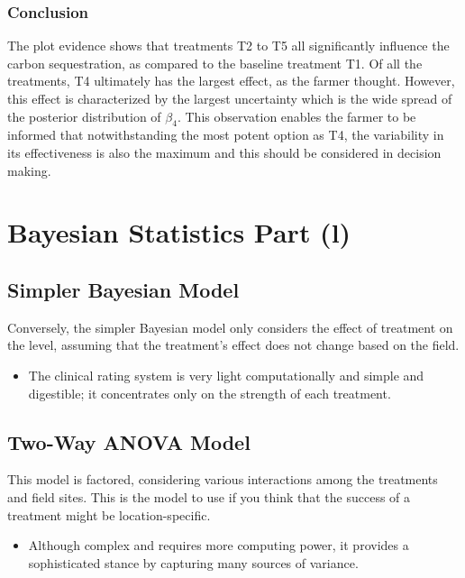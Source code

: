 \documentclass[
]{article}
\providecommand{\tightlist}{%
  \setlength{\itemsep}{0pt}\setlength{\parskip}{0pt}}
\begin{document}
\subsubsection{Conclusion}\label{conclusion-3}

The plot evidence shows that treatments T2 to T5 all significantly
influence the carbon sequestration, as compared to the baseline
treatment T1. Of all the treatments, T4 ultimately has the largest
effect, as the farmer thought. However, this effect is characterized by
the largest uncertainty which is the wide spread of the posterior
distribution of \(\beta_4\). This observation enables the farmer to be
informed that notwithstanding the most potent option as T4, the
variability in its effectiveness is also the maximum and this should be
considered in decision making.

\section{Bayesian Statistics Part (l)}\label{bayesian-statistics-part-l}

\subsection{Simpler Bayesian Model}\label{simpler-bayesian-model}

Conversely, the simpler Bayesian model only considers the effect of
treatment on the level, assuming that the treatment's effect does not
change based on the field.

\begin{itemize}
\tightlist
\item
  The clinical rating system is very light computationally and simple
  and digestible; it concentrates only on the strength of each
  treatment.
\end{itemize}

\subsection{Two-Way ANOVA Model}\label{two-way-anova-model}

This model is factored, considering various interactions among the
treatments and field sites. This is the model to use if you think that
the success of a treatment might be location-specific.

\begin{itemize}
\tightlist
\item
  Although complex and requires more computing power, it provides a
  sophisticated stance by capturing many sources of variance.
\end{itemize}
\end{document}
